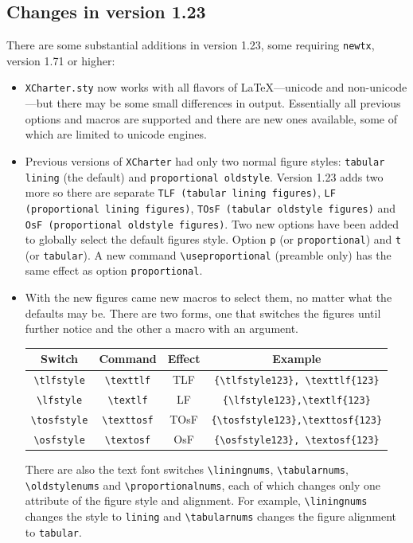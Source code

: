 \documentclass[11pt]{article}
\begin{document}
\subsection*{Changes in version 1.23}
There are some substantial additions in version 1.23, some requiring {\tt newtx}, version 1.71 or higher:
\begin{itemize}
\item
{\tt XCharter.sty} now works with all flavors of LaTeX---unicode and non-unicode---but there may be some small differences in output. Essentially all previous  options and macros are supported and there are new ones available, some of which are limited to unicode engines.
\item Previous versions of {\tt XCharter} had only two normal figure styles: {\tt tabular lining} (the default) and {\tt proportional oldstyle}. Version 1.23 adds two more so there are separate {\tt TLF (tabular lining figures)}, {\tt LF (proportional lining figures)}, {\tt TOsF (tabular oldstyle figures)} and {\tt OsF (proportional oldstyle figures)}. Two new options have been added to globally select the default figures style. Option {\tt p} (or {\tt proportional}) and {\tt t} (or {\tt tabular}). A new command \verb|\useproportional| (preamble only) has the same effect as option {\tt proportional}.
\item With the new figures came new macros to select them, no matter what the defaults may be. There are two forms, one that switches the figures until further notice and the other a macro with an argument.
\begin{center}
  \begin{tabular}{@{} cccc @{}}
    \toprule
    Switch& Command & Effect & Example \\ 
    \midrule
    \verb|\tlfstyle| &\verb|\texttlf| & TLF & \verb|{\tlfstyle123}, \texttlf{123}| \\ 
    \verb|\lfstyle| &\verb|\textlf| & LF & \verb|{\lfstyle123},\textlf{123}| \\ 
   \verb|\tosfstyle| &\verb|\texttosf| & TOsF & \verb|{\tosfstyle123},\texttosf{123}| \\ 
  \verb|\osfstyle| &\verb|\textosf| & OsF & \verb|{\osfstyle123}, \textosf{123}| \\ 
    \bottomrule
  \end{tabular}
\end{center}
There are also the text font switches \verb|\liningnums|, \verb|\tabularnums|, \verb|\oldstylenums| and \verb|\proportionalnums|, each of which changes only one attribute of the figure style and alignment. For example, \verb|\liningnums| changes the style to {\tt lining} and \verb|\tabularnums| changes the figure alignment to {\tt tabular}.

\end{itemize}
\end{document}
